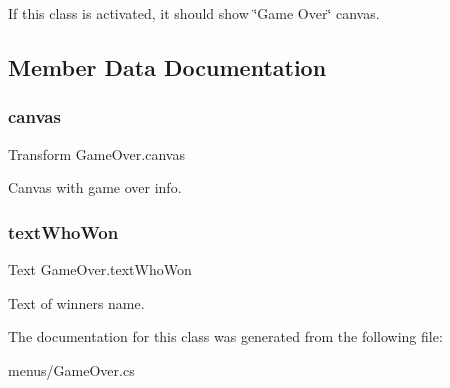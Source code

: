 If this class is activated, it should show \char`\"{}\+Game Over\char`\"{} canvas. 



\subsection{Member Data Documentation}
\mbox{\label{class_game_over_ad71e27e7f62da1f7abba74e31d89e9d5}} 
\subsubsection{\texorpdfstring{canvas}{canvas}}
{\footnotesize\ttfamily Transform Game\+Over.\+canvas}



Canvas with game over info. 

\mbox{\label{class_game_over_a05fc5c0c7a78b9a32de2bd9a9bfcac57}} 
\subsubsection{\texorpdfstring{text\+Who\+Won}{textWhoWon}}
{\footnotesize\ttfamily Text Game\+Over.\+text\+Who\+Won}



Text of winner\textquotesingle{}s name. 



The documentation for this class was generated from the following file\+:\begin{DoxyCompactItemize}
\item 
menus/Game\+Over.\+cs\end{DoxyCompactItemize}
